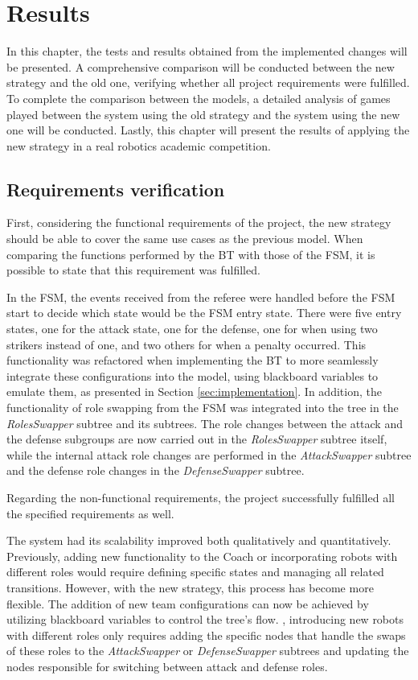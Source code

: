 \chapter{Results}
\label{ch:results}

In this chapter, the tests and results obtained from the implemented changes will be presented. A comprehensive comparison will be conducted between the new strategy and the old one, verifying whether all project requirements were fulfilled. To complete the comparison between the models, a detailed analysis of games played between the system using the old strategy and the system using the new one will be conducted. Lastly, this chapter will present the results of applying the new strategy in a real robotics academic competition.

\section{Requirements verification}

First, considering the functional requirements of the project, the new strategy should be able to cover the same use cases as the previous model. When comparing the functions performed by the BT with those of the FSM, it is possible to state that this requirement was fulfilled.

In the FSM, the events received from the referee were handled before the FSM start to decide which state would be the FSM entry state. There were five entry states, one for the attack state, one for the defense, one for when using two strikers instead of one, and two others for when a penalty occurred. This functionality was refactored when implementing the BT to more seamlessly integrate these configurations into the model, using blackboard variables to emulate them, as presented in Section \ref{sec:implementation}. In addition, the functionality of role swapping from the FSM was integrated into the tree in the \textit{RolesSwapper} subtree and its subtrees. The role changes between the attack and the defense subgroups are now carried out in the \textit{RolesSwapper} subtree itself, while the internal attack role changes are performed in the \textit{AttackSwapper} subtree and the defense role changes in the \textit{DefenseSwapper} subtree.

Regarding the non-functional requirements, the project successfully fulfilled all the specified requirements as well.

The system had its scalability improved both qualitatively and quantitatively. Previously, adding new functionality to the Coach or incorporating robots with different roles would require defining specific states and managing all related transitions. However, with the new strategy, this process has become more flexible. The addition of new team configurations can now be achieved by utilizing blackboard variables to control the tree's flow. , introducing new robots with different roles only requires adding the specific nodes that handle the swaps of these roles to the \textit{AttackSwapper} or \textit{DefenseSwapper} subtrees and updating the nodes responsible for switching between attack and defense roles.

